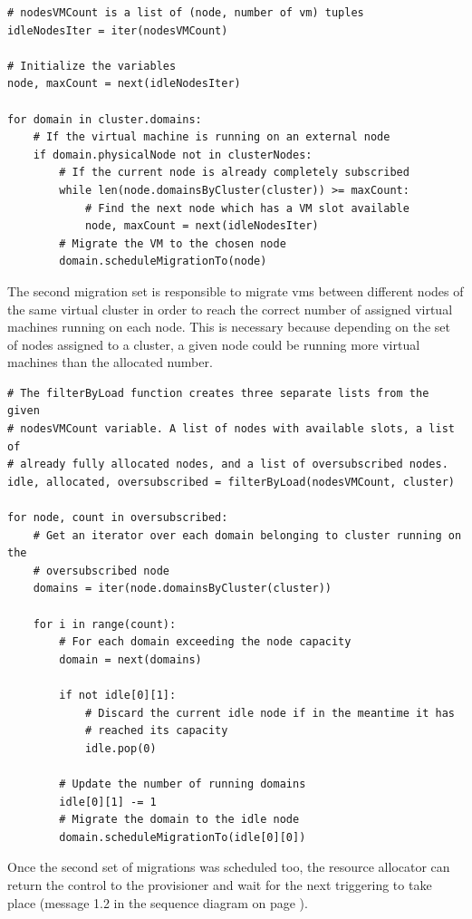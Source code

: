 \lstset{language=python,caption=VMs migration from external nodes,label=lst:extmigration}
\begin{lstlisting}
# nodesVMCount is a list of (node, number of vm) tuples
idleNodesIter = iter(nodesVMCount)

# Initialize the variables
node, maxCount = next(idleNodesIter)

for domain in cluster.domains:
	# If the virtual machine is running on an external node
	if domain.physicalNode not in clusterNodes:
		# If the current node is already completely subscribed
		while len(node.domainsByCluster(cluster)) >= maxCount:
			# Find the next node which has a VM slot available
			node, maxCount = next(idleNodesIter)
		# Migrate the VM to the chosen node
		domain.scheduleMigrationTo(node)
\end{lstlisting}

The second migration set is responsible to migrate \glspl{vm} between different nodes of the same virtual cluster in order to reach the correct number of assigned virtual machines running on each node. This is necessary because depending on the set of nodes assigned to a cluster, a given node could be running more virtual machines than the allocated number.

\lstset{language=python,caption=Leveling node usage inside a virtual cluster,label=lst:insidemigration}
\begin{lstlisting}
# The filterByLoad function creates three separate lists from the given 
# nodesVMCount variable. A list of nodes with available slots, a list of 
# already fully allocated nodes, and a list of oversubscribed nodes.
idle, allocated, oversubscribed = filterByLoad(nodesVMCount, cluster)

for node, count in oversubscribed:
	# Get an iterator over each domain belonging to cluster running on the 
	# oversubscribed node
	domains = iter(node.domainsByCluster(cluster))
	
	for i in range(count):
		# For each domain exceeding the node capacity
		domain = next(domains)
		
		if not idle[0][1]:
			# Discard the current idle node if in the meantime it has 
			# reached its capacity
			idle.pop(0)

		# Update the number of running domains
		idle[0][1] -= 1
		# Migrate the domain to the idle node
		domain.scheduleMigrationTo(idle[0][0])
\end{lstlisting}

Once the second set of migrations was scheduled too, the resource allocator can return the control to the provisioner and wait for the next triggering to take place (message 1.2 in the sequence diagram on page \pageref{fig:migration-sequence}).



